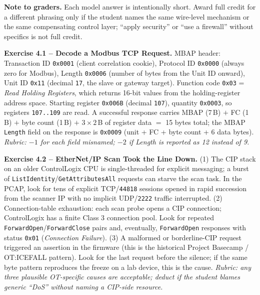 \documentclass[11pt,a4paper]{article}
\begin{document}
\sheetheader

\noindent\textbf{Note to graders.}
Each model answer is intentionally short. Award full credit for a different
phrasing only if the student names the same wire-level mechanism or the same
compensating control layer; ``apply security'' or ``use a firewall'' without
specifics is not full credit.

\vspace{0.6em}

\begin{solutionbox}
\textbf{Exercise 4.1 -- Decode a Modbus TCP Request.}
MBAP header: Transaction ID \texttt{0x0001} (client correlation cookie),
Protocol ID \texttt{0x0000} (always zero for Modbus), Length \texttt{0x0006}
(number of bytes from the Unit ID onward), Unit ID \texttt{0x11} (decimal
\texttt{17}, the slave or gateway target).
Function code \texttt{0x03} = \emph{Read Holding Registers}, which returns
16-bit values from the holding-register address space.
Starting register \texttt{0x006B} (decimal \texttt{107}), quantity
\texttt{0x0003}, so registers \texttt{107..109} are read.
A successful response carries MBAP (7\,B) $+$ FC (1\,B) $+$ byte count
(1\,B) $+$ $3\!\times\!2$\,B of register data $=$ 15 bytes total; the MBAP
\texttt{Length} field on the response is \texttt{0x0009} (unit + FC + byte
count + 6 data bytes).
\textit{Rubric: $-1$ for each field misnamed; $-2$ if Length is reported as
12 instead of 9.}
\end{solutionbox}

\begin{solutionbox}
\textbf{Exercise 4.2 -- EtherNet/IP Scan Took the Line Down.}
(1) The CIP stack on an older ControlLogix CPU is single-threaded for
explicit messaging; a burst of \texttt{ListIdentity}/\texttt{GetAttributesAll}
requests can starve the scan task. In the PCAP, look for tens of explicit
TCP/\texttt{44818} sessions opened in rapid succession from the scanner IP
with no implicit UDP/\texttt{2222} traffic interrupted.
(2) Connection-table exhaustion: each scan probe opens a CIP connection;
ControlLogix has a finite Class 3 connection pool. Look for repeated
\texttt{ForwardOpen}/\texttt{ForwardClose} pairs and, eventually,
\texttt{ForwardOpen} responses with status \texttt{0x01}
(\emph{Connection Failure}).
(3) A malformed or borderline-CIP request triggered an assertion in the
firmware (this is the historical Project Basecamp / OT:ICEFALL pattern).
Look for the last request before the silence; if the same byte pattern
reproduces the freeze on a lab device, this is the cause.
\textit{Rubric: any three plausible OT-specific causes are acceptable; deduct
if the student blames generic ``DoS'' without naming a CIP-side resource.}
\end{solutionbox}
\end{document}
